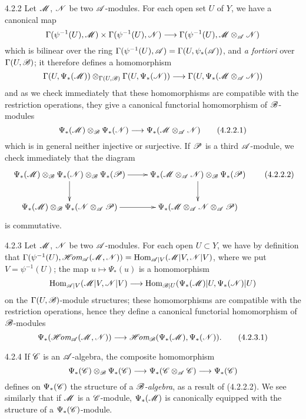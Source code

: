 \begin{env}{4.2.2}
\label{env-0.4.2.2}
Let $\mathscr{M}$, $\mathscr{N}$ be two $\mathscr{A}$-modules. For each open set $U$ of $Y$, we have a
canonical map
\[
  \Gamma(\psi^{-1}(U),\mathscr{M})\times\Gamma(\psi^{-1}(U),\mathscr{N})
  \longrightarrow\Gamma(\psi^{-1}(U),\mathscr{M}\otimes_\mathscr{A}\mathscr{N})
\]
which is bilinear over the ring $\Gamma(\psi^{-1}(U),\mathscr{A})=\Gamma(U,\psi_*(\mathscr{A}))$, and
\emph{a fortiori} over $\Gamma(U,\mathscr{B})$; it therefore defines a homomorphism
\[
  \Gamma(U,\Psi_*(\mathscr{M}))\otimes_{\Gamma(U,\mathscr{B})}\Gamma(U,\Psi_*(\mathscr{N}))
  \longrightarrow\Gamma(U,\Psi_*(\mathscr{M}\otimes_\mathscr{A}\mathscr{N}))
\]
and as we check immediately that these homomorphisms are compatible with the restriction
operations, they give a canonical functorial homomorphism of $\mathscr{B}$-modules
\[
  \Psi_*(\mathscr{M})\otimes_\mathscr{B}\Psi_*(\mathscr{N})
  \longrightarrow\Psi_*(\mathscr{M}\otimes_\mathscr{A}\mathscr{N})
  \tag{4.2.2.1}
\]
which is in general neither injective or surjective. If $\mathscr{P}$ is a third $\mathscr{A}$-module,
we check immediately that the diagram
\[
  \xymatrix{
    \Psi_*(\sh{M})\otimes_\sh{B}\Psi_*(\sh{N})\otimes_\sh{B}\Psi_*(\sh{P})\ar[r]\ar[d]
    & \Psi_*(\sh{M}\otimes_\sh{A}\sh{N})\otimes_\sh{B}\Psi_*(\sh{P})\ar[d]\\
    \Psi_*(\sh{M})\otimes_\sh{B}\Psi_*(\sh{N}\otimes_\sh{A}\sh{P})\ar[r]
    & \Psi_*(\sh{M}\otimes_\sh{A}\sh{N}\otimes_\sh{A}\sh{P})
  }
  \tag{4.2.2.2}
\]
is commutative.
\end{env}

\begin{env}{4.2.3}
\label{env-0.4.2.3}
Let $\mathscr{M}$, $\mathscr{N}$ be two $\mathscr{A}$-modules. For each open $U\subset Y$, we have by
definition that
$\Gamma(\psi^{-1}(U),\mathscr{H}\!\textit{om}_\mathscr{A}(\mathscr{M},\mathscr{N}))={\mathop{\mathrm{Hom}}\nolimits}_{\mathscr{A}|V}(\mathscr{M}|V,\mathscr{N}|V)$, where
we put $V=\psi^{-1}(U)$; the map $u\mapsto\Psi_*(u)$ is a homomorphism
\[
  {\mathop{\mathrm{Hom}}\nolimits}_{\mathscr{A}|V}(\mathscr{M}|V,\mathscr{N}|V)
  \longrightarrow{\mathop{\mathrm{Hom}}\nolimits}_{\mathscr{B}|U}(\Psi_*(\mathscr{M})|U,\Psi_*(\mathscr{N})|U)
\]
on the $\Gamma(U,\mathscr{B})$-module structures; these homomorphisms are compatible with the
restriction operations, hence they define a canonical functorial homomorphism of
$\mathscr{B}$-modules
\[
  \Psi_*(\mathscr{H}\!\textit{om}_\mathscr{A}(\mathscr{M},\mathscr{N}))
  \longrightarrow\mathscr{H}\!\textit{om}_\mathscr{B}(\Psi_*(\mathscr{M}),\Psi_*(\mathscr{N})).
  \tag{4.2.3.1}
\]
\end{env}

\begin{env}{4.2.4}
\label{env-0.4.2.4}
If $\mathscr{C}$ is an $\mathscr{A}$-algebra, the composite homomorphism
\[
  \Psi_*(\mathscr{C})\otimes_\mathscr{B}\Psi_*(\mathscr{C})
  \longrightarrow\Psi_*(\mathscr{C}\otimes_\mathscr{A}\mathscr{C})
  \longrightarrow\Psi_*(\mathscr{C})
\]
defines on $\Psi_*(\mathscr{C})$ the structure of a \emph{$\mathscr{B}$-algebra}, as a result of
(4.2.2.2). We see similarly that if $\mathscr{M}$ is a $\mathscr{C}$-module, $\Psi_*(\mathscr{M})$ is
canonically equipped with the structure of a $\Psi_*(\mathscr{C})$-module.
\end{env}

